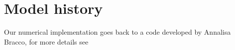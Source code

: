 \chapter{Model history}
Our numerical implementation goes back to a code developed
by Annalisa Bracco, for more details see \cite{braccoandmcwilliams2010}
